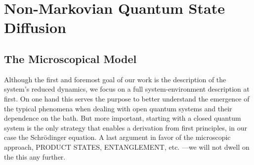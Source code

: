 \chapter{Non-Markovian Quantum State Diffusion}
\label{chap:nmqsd}



\section{The Microscopical Model}
\label{sec:nmqsd.model}
%

Although the first and foremost goal of our work is the description of the system's reduced dynamics, we focus on a full system-environment description at first.
On one hand this serves the purpose to better understand the emergence of the typical phenomena when dealing with open quantum systems and their dependence on the bath.
But more important, starting with a closed quantum system is the only strategy that enables a derivation from first principles, in our case the Schrödinger equation.
A last argument in favor of the microscopic approach, PRODUCT STATES, ENTANGLEMENT, etc. ---we will not dwell on the this any further.\\

